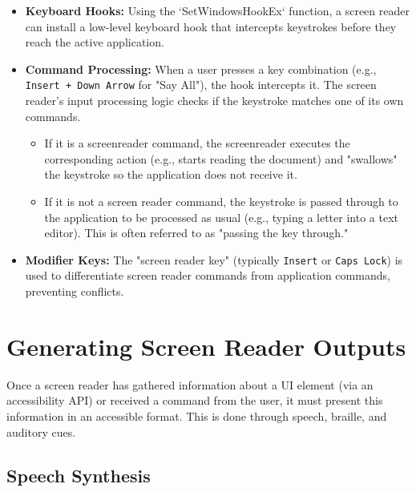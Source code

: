 \begin{itemize}
	\item \textbf{Keyboard Hooks:} Using the `SetWindowsHookEx` function, a screen reader can install a low-level keyboard hook that intercepts keystrokes before they reach the active application.
	\item \textbf{Command Processing:} When a user presses a key combination (e.g., \texttt{Insert + Down Arrow} for "Say All"), the hook intercepts it. The screen reader's input processing logic checks if the keystroke matches one of its own commands.
	      \begin{itemize}
		      \item If it is a \gls{screenreader} command, the \gls{screenreader} executes the corresponding action (e.g., starts reading the document) and "swallows" the keystroke so the application does not receive it.
		      \item If it is not a screen reader command, the keystroke is passed through to the application to be processed as usual (e.g., typing a letter into a text editor). This is often referred to as "passing the key through."
	      \end{itemize}
	\item \textbf{Modifier Keys:} The "screen reader key" (typically \texttt{Insert} or \texttt{Caps Lock}) is used to differentiate screen reader commands from application commands, preventing conflicts.
\end{itemize}

\section{Generating Screen Reader Outputs}
\label{sec:generating-screen-reader-outputs}

Once a screen reader has gathered information about a UI element (via an accessibility API) or received a command from the user, it must present this information in an accessible format. This is done through speech, braille, and auditory cues.

\subsection{Speech Synthesis}
\label{sub:speech-synthesis}

